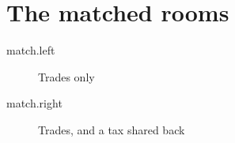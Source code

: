 \section{The matched rooms}

\begin{description}
  \item[match.left] Trades only
  \item[match.right] Trades, and a  tax shared back
\end{description}
